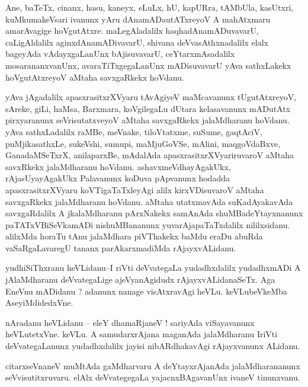 \documentclass{article}
\begin{document}
\begin{mn}%
Ane, baTeTx, cinanx, hasu, kaneyx, eLuLx, hU, kapURra, tAMbUla, kasUtxri, kuMkumakeVsari 
ivanunx yAru dAnamADautATxreyoV A mahAtxmaru amarAvagige hoVgutAtxre. maLegAladalilx 
haqhadAnamADuvavarU, caLigAldalilx aginxdAnamADivavarU, shivana deVvasAthxnadalilx elalx 
bageyAda vAdayxgaLanUnx bAjisuvavarU, ceYtarxmAsadalilx mosarananxvanUnx, 
avaraTiTxgegaLanUnx mADisuvavarU yAva sathxLakekx hoVgutAtxreyoV aMtaha savxgaRkekx hoVdanu.
\end{mn}

\begin{mn}%
yAva jAgadalilx apasxrasitxrXVyaru tAvAgiyeV maMcavanunx tUgutAtxreyoV, sAreke, giLi, haMsa, 
Barxmara, koVgilegaLu dUtara kelasavanunx mADutAtx pirxyaranunx seVrisutatxveyoV aMtaha 
savxgaRkekx jalaMdharanu hoVdanu. yAva sathxLadalilx raMBe, meVnake, tiloVtatxme, suSume, 
gaqtAciV, puMjikasathxLe, sukeVshi, sumupi, maMjuGoVSe, mAlini, maqgoVdaBxve, 
GanadaMSeTxrX, anilaparxBe, mAdalAda apasxrasitxrXVyariruvaroV aMtaha savxRkekx 
jalaMdharanu hoVdanu. ashavxmeVdhayAgakUkx, rAjasUyayAgakUkx Palavanunx koDuva pApvanunx 
hodadda apasxrasitxrXVyaru koVTigaTaTxleyAgi alilx kirxVDisuvaroV aMtaha savxgaRkekx 
jalaMdharanu hoVdanu. aMtaha utatxmavAda suKadAyakavAda savxgaRdalilx A jkalaMdharanu 
pArxNakekx samAnAda shuMBadeYtayxnanunx paTATxVBiSeVkamADi nishuMBananunx 
yuvarAjapaTaTxdalilx nililxsidanu. alilxMda horaTu tAnu jalaMdhara piVThakekx baMdu eraDu 
abuRda vaSaRgaLavaregU tananx parAkarxmadiMda rAjayxvALidanu.
\end{mn}

\begin{mn}%
yudhiSiThxranu heVLidanu--I riVti deVvategaLa yudadhxdalilx yudadhxmADi A jAlaMdharanu 
deVvategaLige ajeVyanAgidudx rAjayxvALidanaSeTx. Aga EneVnu mADidanu ? adanunx nanage 
visAtxravAgi heVLu. keVLubeVkeMba AseyiMdidedxVne.
\end{mn}

\begin{mn}%
nAradanu heVLidanu -- eleY dhamaRjaneV ! sariyAda viSayavanunx heVLutetxVne. keVLu. A 
samudarxrAjana maganAda jalaMdharanu IriVti deVvategaLanunx yudadhxdalilx jayisi 
nibARdhakavAgi rAjayxvanunx ALidanu.
\end{mn}

\begin{mn}%
citarxseVnaneV muMtAda gaMdharvaru A deYtayxrAjanAda jalaMdharananunx seVvisutitxruvaru. 
elAlx deVvategegaLa yajacnxBAgavanUnx ivaneV tinunxvanu.
\end{mn}
\end{document}
